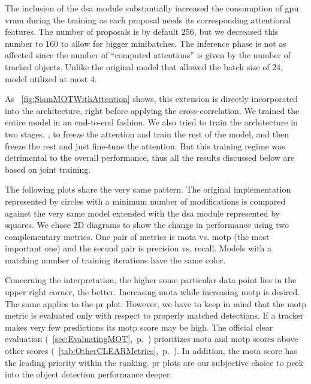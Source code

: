 The inclusion of the \gls{dsa} module substantially increased the consumption of \gls{gpu} \gls{vram} during the training as each proposal needs its corresponding attentional features. The number of proposals is by default $256$, but we decreased this number to $160$ to allow for bigger minibatches. The inference phase is not as affected since the number of ``computed attentions'' is given by the number of tracked objects. Unlike the original model that allowed the batch size of $24$, \dsamodel{} model utilized at most $4$.

As \figtext{}~\ref{fig:SiamMOTWithAttention} shows, this extension is directly incorporated into the architecture, right before applying the cross-correlation. We trained the entire model in an end-to-end fashion. We also tried to train the architecture in two stages, \ietext{}, to freeze the attention and train the rest of the model, and then freeze the rest and just fine-tune the attention. But this training regime was detrimental to the overall performance, thus all the results discussed below are based on joint training.

The following plots share the very same pattern. The original implementation represented by circles with a minimum number of modifications is compared against the very same model extended with the \gls{dsa} module represented by squares. We chose $2$D diagrams to show the change in performance using two complementary metrics. One pair of metrics is \gls{mota} vs. \gls{motp} (the most important one) and the second pair is precision vs. recall. Models with a matching number of training iterations have the same color.

Concerning the interpretation, the higher some particular data point lies in the upper right corner, the better. Increasing \gls{mota} while increasing \gls{motp} is desired. The same applies to the \gls{pr} plot. However, we have to keep in mind that the \gls{motp} metric is evaluated only with respect to properly matched detections. If a tracker makes very few predictions its \gls{motp} score may be high. The official \gls{clear} evaluation (\sectiontext{}~\ref{sec:EvaluatingMOT},~p.~\pageref{sec:EvaluatingMOT}) prioritizes \gls{mota} and \gls{motp} scores above other scores (\tabletext{}~\ref{tab:OtherCLEARMetrics},~p.~\pageref{tab:OtherCLEARMetrics}). In addition, the \gls{mota} score has the leading priority within the ranking. \gls{pr} plots are our subjective choice to peek into the object detection performance deeper.

